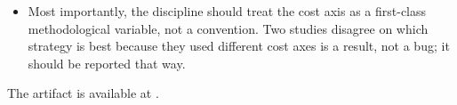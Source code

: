 \begin{itemize}
    deprioritized those here to keep the empirical claim anchored,
    but they are a natural next step. (c) Closing the loop with
    cost-aware samplers that read the calibration ratio at small
    pilot $n$ and adapt their selection accordingly is the
    \emph{designer-side} version of the diagnostic; the diagnostic
    plus the empirical calibration table in
     provides the prior such a sampler
    would need.
    \item Most importantly, the discipline should treat the cost axis
    as a first-class methodological variable, not a convention. Two
    studies disagree on which strategy is best because they used
    different cost axes is a result, not a bug; it should be reported
    that way.
\end{itemize}

The artifact is available at .

